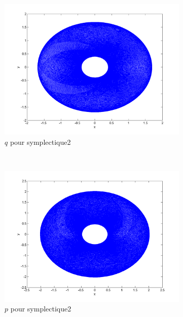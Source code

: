 \begin{figure}
  \begin{subfigure}[b]{0.3\textwidth}
    \includegraphics[width=\textwidth]{images/Q1_symplectique2_q.png}
    \caption{$q$ pour symplectique2}
    \label{fig:q1_symplectique2_q}
  \end{subfigure}%
  ~
  \begin{subfigure}[b]{0.3\textwidth}
    \includegraphics[width=\textwidth]{images/Q1_symplectique2_p.png}
    \caption{$p$ pour symplectique2}
    \label{fig:q1_symplectique2_p}
  \end{subfigure}
  ~
  \begin{subfigure}[b]{0.3\textwidth}

\end{subfigure}
\end{figure}
